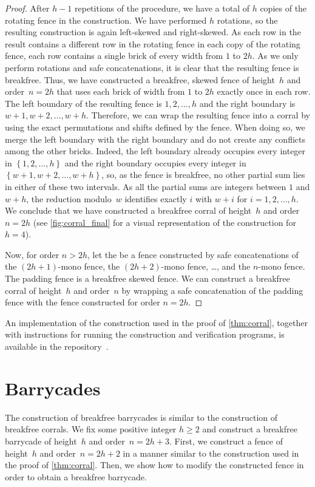 \documentclass[runningheads,envcountsame]{llncs}
\newcommand{\set}[1]{\left\{ #1 \right\}}
\let\ge\geqslant
\begin{document}
\begin{proof}
    After $h-1$ repetitions of the procedure, we have a total of $h$ copies of the rotating fence in the construction.
    We have performed $h$ rotations, so the resulting construction is again left-skewed and right-skewed.
    As each row in the result contains a different row in the rotating fence in each copy of the rotating fence, each row contains a single brick of every width from $1$ to $2h$.
    As we only perform rotations and safe concatenations, it is clear that the resulting fence is breakfree.
    Thus, we have constructed a breakfree, skewed fence of height~$h$ and order~$n=2h$ that uses each brick of width from $1$ to $2h$ exactly once in each row.
    The left boundary of the resulting fence is $1,2,\ldots,h$ and the right boundary is $w+1,w+2,\ldots,w+h$.
    Therefore, we can wrap the resulting fence into a corral by using the exact permutations and shifts defined by the fence.
    When doing so, we merge the left boundary with the right boundary and do not create any conflicts among the other bricks.
    Indeed, the left boundary already occupies every integer in $\set{1,2,\ldots,h}$ and the right boundary occupies every integer in $\set{w+1,w+2,\ldots,w+h}$, so, as the fence is breakfree, no other partial sum lies in either of these two intervals.
    As all the partial sums are integers between $1$ and $w+h$, the reduction modulo~$w$ identifies exactly $i$ with $w+i$ for $i=1,2,\ldots,h$.
    We conclude that we have constructed a breakfree corral of height~$h$ and order~$n=2h$ (see \cref{fig:corral_final} for a visual representation of the construction for $h=4$).

    Now, for order $n>2h$, let the  be a fence constructed by safe concatenations of the $(2h+1)$-mono fence, the $(2h+2)$-mono fence, \ldots, and the $n$-mono fence.
    The padding fence is a breakfree skewed fence.
    We can construct a breakfree corral of height~$h$ and order~$n$ by wrapping a safe concatenation of the padding fence with the fence constructed for order $n=2h$.
\end{proof}

An implementation of the construction used in the proof of \cref{thm:corral}, together with instructions for running the construction and verification programs, is available in the repository~\cite{repo}.

\section{Barrycades}\label{sec:barrycade}
The construction of breakfree barrycades is similar to the construction of breakfree corrals.
We fix some positive integer $h\ge2$ and construct a breakfree barrycade of height~$h$ and order~$n=2h+3$.
First, we construct a fence of height~$h$ and order~$n=2h+2$ in a manner similar to the construction used in the proof of \cref{thm:corral}.
Then, we show how to modify the constructed fence in order to obtain a breakfree barrycade.
\end{document}
